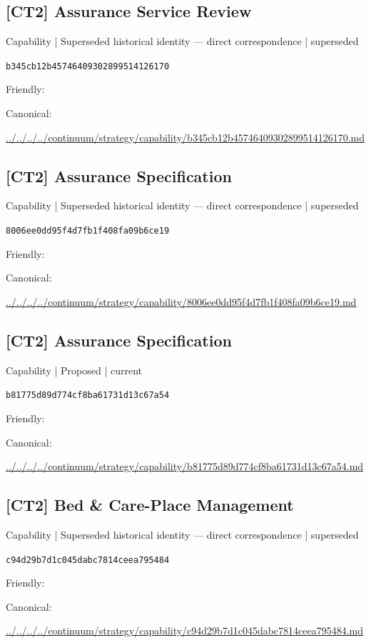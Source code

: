\documentclass[10pt,a4paper]{article}
\begin{document}
\subsection*{[CT2] Assurance Service Review}
{\small Capability | Superseded historical identity — direct correspondence | superseded}\par
\texttt{b345cb12b45746409302899514126170}\par
Friendly: \par
Canonical: \par
{\footnotesize\url{../../../../continuum/strategy/capability/b345cb12b45746409302899514126170.md}}\par
\subsection*{[CT2] Assurance Specification}
{\small Capability | Superseded historical identity — direct correspondence | superseded}\par
\texttt{8006ee0dd95f4d7fb1f408fa09b6ce19}\par
Friendly: \par
Canonical: \par
{\footnotesize\url{../../../../continuum/strategy/capability/8006ee0dd95f4d7fb1f408fa09b6ce19.md}}\par
\subsection*{[CT2] Assurance Specification}
{\small Capability | Proposed | current}\par
\texttt{b81775d89d774cf8ba61731d13c67a54}\par
Friendly: \par
Canonical: \par
{\footnotesize\url{../../../../continuum/strategy/capability/b81775d89d774cf8ba61731d13c67a54.md}}\par
\subsection*{[CT2] Bed \& Care-Place Management}
{\small Capability | Superseded historical identity — direct correspondence | superseded}\par
\texttt{c94d29b7d1c045dabc7814ceea795484}\par
Friendly: \par
Canonical: \par
{\footnotesize\url{../../../../continuum/strategy/capability/c94d29b7d1c045dabc7814ceea795484.md}}\par
\end{document}
